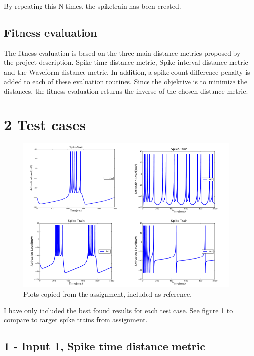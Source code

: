 \documentclass[11pt]{article}
\begin{document}
By repeating this N times, the spiketrain has been created.

\subsection*{Fitness evaluation}

The fitness evaluation is based on the three main distance metrics proposed by the project
description. Spike time distance metric, Spike interval distance metric and the Waveform
distance metric. In addition, a spike-count difference penalty is added to each of these
evaluation routines. Since the objektive is to minimize the distances, the fitness evaluation
returns the inverse of the chosen distance metric.

\section*{2 Test cases}

\begin{figure}
\begin{center}
\mbox{\includegraphics[width=0.99\textwidth]{images/ref.png}}
\end{center}
\caption{Plots copied from the assignment, included as reference.}
\label{fig:0}
\end{figure}

I have only included the best found results for each test case. See figure \ref{fig:0} to compare to
target spike trains from assignment.

\subsection*{1 - Input 1, Spike time distance metric}
\end{document}
